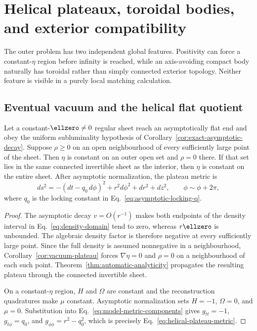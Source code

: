 \section{Helical plateaux, toroidal bodies, and exterior compatibility}
\label{sec:topology-exterior}

The outer problem has two independent global features. Positivity can force a
constant-$\eta$ region before infinity is reached, while an axis-avoiding
compact body naturally has toroidal rather than simply connected exterior
topology. Neither feature is visible in a purely local matching calculation.

\subsection{Eventual vacuum and the helical flat quotient}

\begin{theorem}
\label{thm:eventual-helical-plateau}
Let a constant-$\ellzero\neq0$ regular sheet reach an asymptotically flat
end and obey the uniform subluminality hypothesis of
Corollary~\ref{cor:exact-asymptotic-decay}. Suppose $\rho\geqslant0$ on an
open neighbourhood of every sufficiently large point of the sheet. Then
$\eta$ is constant on an outer open set and $\rho=0$ there. If that set lies
in the same connected invertible sheet as the interior, then $\eta$ is
constant on the entire sheet. After asymptotic normalization, the plateau
metric is
\begin{equation}
ds^2=-(dt-q_0\,d\phi)^2+r^2d\phi^2+dr^2+dz^2,
\qquad \phi\sim\phi+2\pi,
\label{eq:helical-plateau-metric}
\end{equation}
where $q_0$ is the locking constant in
Eq.~\eqref{eq:asymptotic-locking-q}.
\end{theorem}

\begin{proof}
The asymptotic decay $v=O(r^{-1})$ makes both endpoints of the density
interval in Eq.~\eqref{eq:density-domain} tend to zero, whereas
$r\ellzero$ is unbounded. The algebraic density factor is therefore
negative at every sufficiently large point. Since the full density is
assumed nonnegative in a neighbourhood, Corollary~\ref{cor:vacuum-plateau}
forces $\nabla\eta=0$ and $\rho=0$ on a neighbourhood of each such point.
Theorem~\ref{thm:automatic-analyticity} propagates the resulting plateau
through the connected invertible sheet.

On a constant-$\eta$ region, $H$ and $\Omega$ are constant and the
reconstruction quadratures make $\mu$ constant. Asymptotic normalization
sets $H=-1$, $\Omega=0$, and $\mu=0$. Substitution into
Eq.~\eqref{eq:model-metric-components} gives
$g_{tt}=-1$, $g_{t\phi}=q_0$, and
$g_{\phi\phi}=r^2-q_0^2$, which is precisely
Eq.~\eqref{eq:helical-plateau-metric}.
\end{proof}

